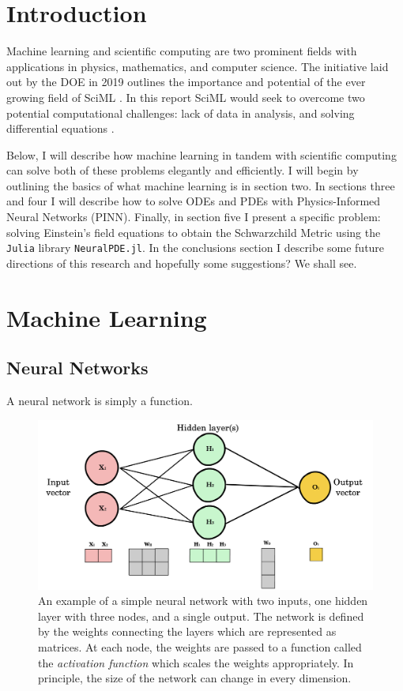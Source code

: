 \documentclass{CUP-JNL-DTM}%
\theoremstyle{definition}
\numberwithin{equation}{section}
\newcommand{\Julia}{\texttt{Julia} }
\begin{document}
\section{Introduction}

Machine learning and scientific computing are two prominent fields with applications in physics, mathematics, and computer science. The initiative laid out by the DOE in 2019 outlines the importance and potential of the ever growing field of SciML \cite{bakerWorkshopReportBasic2019}. In this report SciML would seek to overcome two potential computational challenges: lack of data in analysis, and solving differential equations \cite{karniadakisPhysicsinformedMachineLearning2021}. 

Below, I will describe how machine learning in tandem with scientific computing can solve both of these problems elegantly and efficiently. I will begin by outlining the basics of what machine learning is in section two. In sections three and four I will describe how to solve ODEs and PDEs with Physics-Informed Neural Networks (PINN). Finally, in section five I present a specific problem: solving Einstein's field equations to obtain the Schwarzchild Metric using the \Julia library \texttt{NeuralPDE.jl}. In the conclusions section I describe some future directions of this research and hopefully some suggestions? We shall see. 

\section{Machine Learning}


\subsection{Neural Networks}

A neural network is simply a function. 

\begin{figure}
\centering
\includegraphics[width=0.7\linewidth]{figures/NN_example.png}
\caption{An example of a simple neural network with two inputs, one hidden layer with three nodes, and a single output. The network is defined by the weights connecting the layers which are represented as matrices. At each node, the weights are passed to a function called the \emph{activation function} which scales the weights appropriately. In principle, the size of the network can change in every dimension. }
\label{fig:NNexample}
\end{figure}
\end{document}
